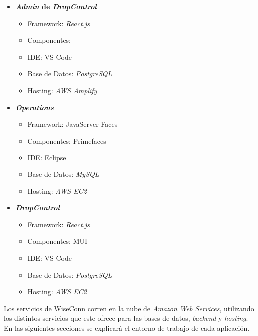 \begin{itemize}
    \item \textbf{\textit{Admin} de \textit{DropControl}}
    \begin{itemize}
        \item Framework: \textit{React.js}
        \item Componentes: 
        \item IDE: VS Code
        \item Base de Datos: \textit{PostgreSQL}
        \item Hosting: \textit{AWS Amplify}
    \end{itemize}
    \item \textbf{\textit{Operations}}
    \begin{itemize}
        \item Framework: JavaServer Faces
        \item Componentes: Primefaces
        \item IDE: Eclipse
        \item Base de Datos: \textit{MySQL}
        \item Hosting: \textit{AWS EC2}
    \end{itemize}
    \item \textbf{\textit{DropControl}}
    \begin{itemize}
        \item Framework: \textit{React.js}
        \item Componentes: MUI
        \item IDE: VS Code
        \item Base de Datos: \textit{PostgreSQL}
        \item Hosting: \textit{AWS EC2}
    \end{itemize}
    \iffalse\item \textbf{\textit{SETUP}}
    \begin{itemize}
        \item Framework: JavaServer Faces, Primefaces
        \item IDE: Eclipse
        \item Base de Datos: \textit{PostgreSQL}
        \item Hosting: \textit{AWS EC2}
    \end{itemize}\fi
\end{itemize}

\iffalse
Los servicios de WiseConn corren en la nube de \textit{Amazon Web Services}, utilizando los distintos servicios que este ofrece para las bases de datos, \textit{backend} y \textit{hosting}. En las siguientes secciones se explicará el entorno de trabajo de cada aplicación.

